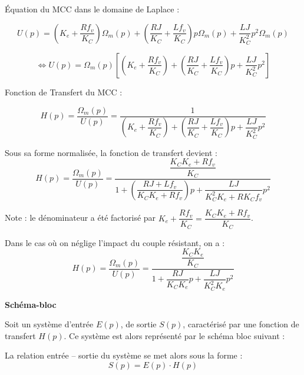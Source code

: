 \documentclass[11pt,oneside]{article}
\begin{document}
\begin{exemple}
Équation du MCC dans le domaine de Laplace :

$$
U(p)= 
 \left( K_e + \dfrac{R f_v}{K_C}\right) \Omega_m(p)
+\left( \dfrac{RJ}{K_C} + \dfrac{Lf_v}{K_C} \right) p \Omega_m(p)
+\dfrac{LJ}{K_C^2}  p^2 \Omega_m(p)
$$

$$ \Longleftrightarrow
U(p)= \Omega_m(p) \left[ 
 \left( K_e + \dfrac{R f_v}{K_C}\right) 
+\left( \dfrac{RJ}{K_C} + \dfrac{Lf_v}{K_C} \right) p 
+\dfrac{LJ}{K_C^2}  p^2 
\right]
$$


Fonction de Transfert du MCC :

$$
H(p)=\dfrac{\Omega_m(p)}{U(p)}
=\dfrac{1}{ \left( K_e + \dfrac{R f_v}{K_C}\right) 
+\left( \dfrac{RJ}{K_C} + \dfrac{Lf_v}{K_C} \right) p 
+\dfrac{LJ}{K_C^2}  p^2 }
$$

Sous sa forme normalisée, la fonction de transfert devient : 
$$
H(p)=\dfrac{\Omega_m(p)}{U(p)}
=\dfrac{\dfrac{K_C K_e + R f_v}{K_C}}{ 1
+\left( \dfrac{RJ + Lf_v}{K_C K_e + R f_v} \right) p 
+\dfrac{LJ}{ K_C^2 K_e + RK_C f_v}  p^2 }
$$

Note : le dénominateur a été factorisé par $K_e + \dfrac{R f_v}{K_C} = \dfrac{K_C K_e + R f_v}{K_C} $.



Dans le cas où on néglige l'impact du couple résistant, on a :
$$
H(p)=\dfrac{\Omega_m(p)}{U(p)}
=\dfrac{
\dfrac{K_C K_e}{K_C}}{ 1
+ \dfrac{RJ}{K_C K_e } p 
+\dfrac{LJ}{ K_C^2 K_e }  
p^2 }
$$

\end{exemple}

\begin{defi}
 \textbf{Schéma-bloc}

Soit un système d'entrée $E(p)$, de sortie $S(p)$, caractérisé par une fonction
de transfert $H(p)$. Ce système est alors représenté par le schéma bloc suivant
: 
\begin{center}
\end{center}

La relation entrée -- sortie du système se met alors sous la forme : 
$$
S(p) = E(p) \cdot H(p)
$$
\end{defi}
\end{document}

